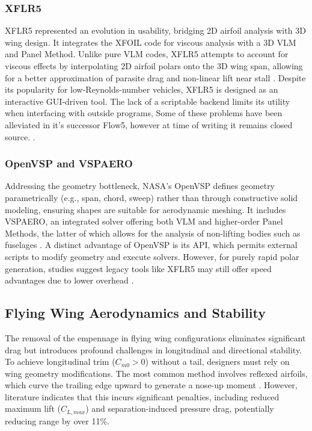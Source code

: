 \documentclass[12pt]{article}
\begin{document}
\subsubsection{XFLR5} XFLR5 represented an evolution in usability, bridging 2D airfoil analysis with 3D wing design. It integrates the XFOIL code for viscous analysis with a 3D VLM and Panel Method. Unlike pure VLM codes, XFLR5 attempts to account for viscous effects by interpolating 2D airfoil polars onto the 3D wing span, allowing for a better approximation of parasite drag and non-linear lift near stall \cite{Lafifi2020}. Despite its popularity for low-Reynolds-number vehicles, XFLR5 is designed as an interactive GUI-driven tool. The lack of a scriptable backend limits its utility when interfacing with outside programs, Some of these problems have been alleviated in it's successor Flow5, however at time of writing it remains closed source. \cite{Lafifi2020}.

\subsubsection{OpenVSP and VSPAERO} Addressing the geometry bottleneck, NASA’s OpenVSP defines geometry parametrically (e.g., span, chord, sweep) rather than through constructive solid modeling, ensuring shapes are suitable for aerodynamic meshing. It includes VSPAERO, an integrated solver offering both VLM and higher-order Panel Methods, the latter of which allows for the analysis of non-lifting bodies such as fuselages \cite{VSPAERO2024}. A distinct advantage of OpenVSP is its API, which permits external scripts to modify geometry and execute solvers. However, for purely rapid polar generation, studies suggest legacy tools like XFLR5 may still offer speed advantages due to lower overhead \cite{VSPAERO2024}.


\subsection{Flying Wing Aerodynamics and Stability}
The removal of the empennage in flying wing configurations eliminates significant drag but introduces profound challenges in longitudinal and directional stability. To achieve longitudinal trim ($C_{m0} > 0$) without a tail, designers must rely on wing geometry modifications. The most common method involves reflexed airfoils, which curve the trailing edge upward to generate a nose-up moment \cite{MDPI2025}. However, literature indicates that this incurs significant penalties, including reduced maximum lift ($C_{L,max}$) and separation-induced pressure drag, potentially reducing range by over 11\%.
\end{document}
